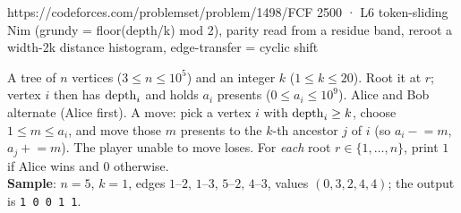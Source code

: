   {https://codeforces.com/problemset/problem/1498/F}{CF 2500 · L6}
  {token-sliding Nim (grundy = floor(depth/k) mod 2), parity read from a residue band, reroot a width-2k distance histogram, edge-transfer = cyclic shift}

\begin{problemstatement}
A tree of $n$ vertices ($3 \le n \le 10^{5}$) and an integer $k$
($1 \le k \le 20$). Root it at $r$; vertex $i$ then has $\operatorname{depth}_i$ and holds
$a_i$ presents ($0 \le a_i \le 10^{9}$). Alice and Bob alternate (Alice first).
A move: pick a vertex $i$ with $\operatorname{depth}_i \ge k$, choose $1 \le m \le a_i$, and move
those $m$ presents to the $k$-th ancestor $j$ of $i$ (so $a_i \mathrel{-}= m$,
$a_j \mathrel{+}= m$). The player unable to move loses. For \emph{each} root
$r \in \{1,\dots,n\}$, print $1$ if Alice wins and $0$ otherwise.\\
\textbf{Sample}: $n=5$, $k=1$, edges $1\text{--}2,\,1\text{--}3,\,5\text{--}2,\,
4\text{--}3$, values $(0,3,2,4,4)$; the output is \texttt{1 0 0 1 1}.
\end{problemstatement}

